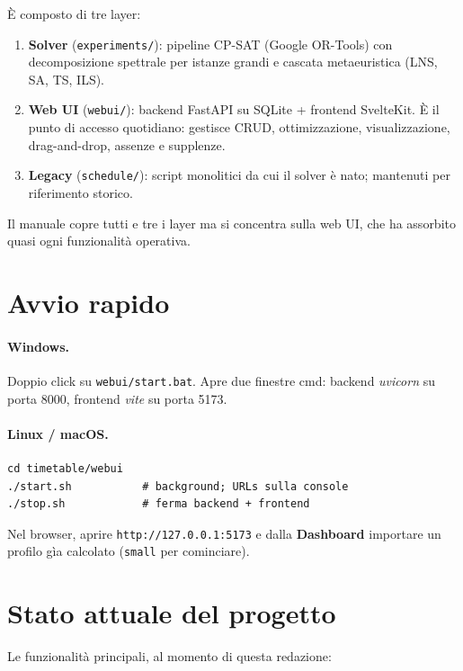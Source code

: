 \`E composto di tre layer:

\begin{enumerate}
  \item \textbf{Solver} (\texttt{experiments/}): pipeline CP-SAT
        (Google OR-Tools) con decomposizione spettrale per istanze
        grandi e cascata metaeuristica (LNS, SA, TS, ILS).
  \item \textbf{Web UI} (\texttt{webui/}): backend FastAPI su
        SQLite + frontend SvelteKit. \`E il punto di accesso quotidiano:
        gestisce CRUD, ottimizzazione, visualizzazione, drag-and-drop,
        assenze e supplenze.
  \item \textbf{Legacy} (\texttt{schedule/}): script monolitici da cui
        il solver \`e nato; mantenuti per riferimento storico.
\end{enumerate}

Il manuale copre tutti e tre i layer ma si concentra sulla web UI,
che ha assorbito quasi ogni funzionalit\`a operativa.

\section{Avvio rapido}

\paragraph{Windows.} Doppio click su \texttt{webui/start.bat}.
Apre due finestre cmd: backend \emph{uvicorn} su porta 8000, frontend
\emph{vite} su porta 5173.

\paragraph{Linux / macOS.}
\begin{lstlisting}[style=shell]
cd timetable/webui
./start.sh           # background; URLs sulla console
./stop.sh            # ferma backend + frontend
\end{lstlisting}

Nel browser, aprire \texttt{http://127.0.0.1:5173} e dalla
\textbf{Dashboard} importare un profilo g\`ia calcolato
(\texttt{small} per cominciare).

\section{Stato attuale del progetto}

Le funzionalit\`a principali, al momento di questa redazione:

